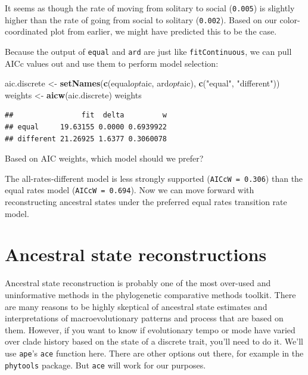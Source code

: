 \documentclass[]{book}
\newenvironment{Shaded}{\begin{snugshade}}{\end{snugshade}}
\newcommand{\KeywordTok}[1]{\textcolor[rgb]{0.13,0.29,0.53}{\textbf{{#1}}}}
\newcommand{\StringTok}[1]{\textcolor[rgb]{0.31,0.60,0.02}{{#1}}}
\newcommand{\NormalTok}[1]{{#1}}
\begin{document}
It seems as though the rate of moving from solitary to social
(\texttt{0.005}) is slightly higher than the rate of going from social
to solitary (\texttt{0.002}). Based on our color-coordinated plot from
earlier, we might have predicted this to be the case.

Because the output of \texttt{equal} and \texttt{ard} are just like
\texttt{fitContinuous}, we can pull AICc values out and use them to
perform model selection:

\begin{Shaded}
\begin{Highlighting}[]
\NormalTok{aic.discrete <-}\StringTok{ }\KeywordTok{setNames}\NormalTok{(}\KeywordTok{c}\NormalTok{(equal$opt$aic, ard$opt$aic), }\KeywordTok{c}\NormalTok{(}\StringTok{"equal"}\NormalTok{, }\StringTok{"different"}\NormalTok{))}
\NormalTok{weights <-}\StringTok{ }\KeywordTok{aicw}\NormalTok{(aic.discrete)}
\NormalTok{weights}
\end{Highlighting}
\end{Shaded}

\begin{verbatim}
##                fit  delta         w
## equal     19.63155 0.0000 0.6939922
## different 21.26925 1.6377 0.3060078
\end{verbatim}

Based on AIC weights, which model should we prefer?

The all-rates-different model is less strongly supported
(\texttt{AICcW\ =\ 0.306}) than the equal rates model
(\texttt{AICcW\ =\ 0.694}). Now we can move forward with reconstructing
ancestral states under the preferred equal rates transition rate model.

\section{Ancestral state
reconstructions}\label{ancestral-state-reconstructions}

Ancestral state reconstruction is probably one of the most over-used and
uninformative methods in the phylogenetic comparative methods toolkit.
There are many reasons to be highly skeptical of ancestral state
estimates and interpretations of macroevolutionary patterns and process
that are based on them. However, if you want to know if evolutionary
tempo or mode have varied over clade history based on the state of a
discrete trait, you'll need to do it. We'll use \texttt{ape}'s
\texttt{ace} function here. There are other options out there, for
example in the \texttt{phytools} package. But \texttt{ace} will work for
our purposes.
\end{document}
